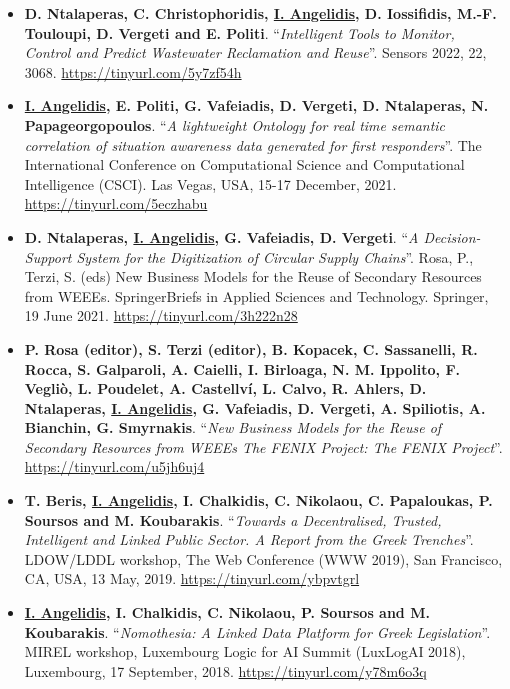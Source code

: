 \documentclass[a4paper,oneside,10pt]{article}
\begin{document}
\begin{itemize}

\item \textbf{D. Ntalaperas, C. Christophoridis, \underline{I. Angelidis}, D. Iossifidis, M.-F. Touloupi, D. Vergeti and E. Politi}. ``\textit{Intelligent Tools to Monitor, Control and Predict Wastewater Reclamation and Reuse}''. Sensors 2022, 22, 3068. \url{https://tinyurl.com/5y7zf54h}

\item \textbf{\underline{I. Angelidis}, E. Politi, G. Vafeiadis, D. Vergeti, D. Ntalaperas, N. Papageorgopoulos}. ``\textit{A lightweight Ontology for real time semantic correlation of situation awareness data generated for first responders}''. The International Conference on Computational Science and Computational Intelligence (CSCI). Las Vegas, USA, 15-17 December, 2021. \url{https://tinyurl.com/5eczhabu}

\item \textbf{D. Ntalaperas, \underline{I. Angelidis}, G. Vafeiadis, D. Vergeti}. ``\textit{A Decision-Support System for the Digitization of Circular Supply Chains}''. Rosa, P., Terzi, S. (eds) New Business Models for the Reuse of Secondary Resources from WEEEs. SpringerBriefs in Applied Sciences and Technology. Springer, 19 June 2021. \url{https://tinyurl.com/3h222n28}

\item \textbf{P. Rosa (editor), S. Terzi (editor), B. Kopacek, C. Sassanelli, R. Rocca, S. Galparoli, A. Caielli, I. Birloaga, N. M. Ippolito, F. Vegliò, L. Poudelet, A. Castellví, L. Calvo, R. Ahlers, D. Ntalaperas, \underline{I. Angelidis}, G. Vafeiadis, D. Vergeti, A. Spiliotis, A. Bianchin, G. Smyrnakis}. ``\textit{New Business Models for the Reuse of Secondary Resources from WEEEs The FENIX Project: The FENIX Project}''. \url{https://tinyurl.com/u5jh6uj4}

\item \textbf{T. Beris, \underline{I. Angelidis}, I. Chalkidis, C. Nikolaou, C. Papaloukas, P. Soursos and M. Koubarakis}. ``\textit{Towards a Decentralised, Trusted, Intelligent and Linked Public Sector. A Report from the Greek Trenches}''. LDOW/LDDL workshop, The Web Conference (WWW 2019), San Francisco, CA, USA, 13 May, 2019. \url{https://tinyurl.com/ybpvtgrl}

\item \textbf{\underline{I. Angelidis}, I. Chalkidis, C. Nikolaou, P. Soursos and M. Koubarakis}. ``\textit{Nomothesia: A Linked Data Platform for Greek Legislation}''. MIREL workshop, Luxembourg Logic for AI Summit (LuxLogAI 2018), Luxembourg, 17 September, 2018. \url{https://tinyurl.com/y78m6o3q}


\end{itemize}
\end{document}
